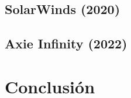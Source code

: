 \documentclass{article}
\begin{document}

\subsection{SolarWinds (2020)}

\subsection{Axie Infinity (2022)}

\section{Conclusión}

\newpage
\printbibliography
\end{document}
